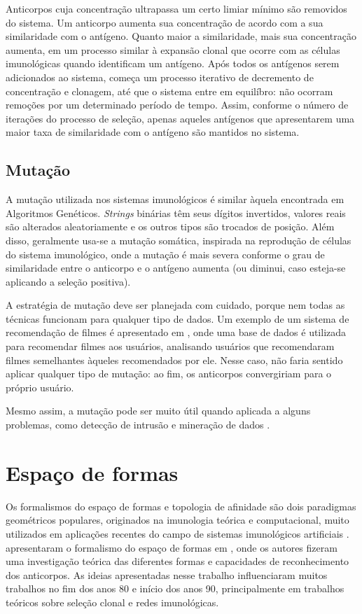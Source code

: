 Anticorpos cuja concentração ultrapassa um certo limiar mínimo são removidos do sistema. Um anticorpo aumenta sua concentração de acordo com a sua similaridade com o antígeno. Quanto maior a similaridade, mais sua concentração aumenta, em um processo similar à expansão clonal que ocorre com as células imunológicas quando identificam um antígeno. Após todos os antígenos serem adicionados ao sistema, começa um processo iterativo de decremento de concentração e clonagem, até que o sistema entre em equilíbro: não ocorram remoções por um determinado período de tempo. Assim, conforme o número de iterações do processo de seleção, apenas aqueles antígenos que apresentarem uma maior taxa de similaridade com o antígeno são mantidos no sistema.

\subsection{Mutação}

A mutação utilizada nos sistemas imunológicos é similar àquela encontrada em Algoritmos Genéticos. \emph{Strings} binárias têm seus dígitos invertidos, valores reais são alterados aleatoriamente e os outros tipos são trocados de posição. Além disso, geralmente usa-se a mutação somática, inspirada na reprodução de células do sistema imunológico, onde a mutação é mais severa conforme o grau de similaridade entre o anticorpo e o antígeno aumenta (ou diminui, caso esteja-se aplicando a seleção positiva). 

A estratégia de mutação deve ser planejada com cuidado, porque nem todas as técnicas funcionam para qualquer tipo de dados. Um exemplo de um sistema de recomendação de filmes é apresentado em \citet{Aickelin2005}, onde uma base de dados é utilizada para recomendar filmes aos usuários, analisando usuários que recomendaram filmes semelhantes àqueles recomendados por ele. Nesse caso, não faria sentido aplicar qualquer tipo de mutação: ao fim, os anticorpos convergiriam para o próprio usuário.

Mesmo assim, a mutação pode ser muito útil quando aplicada a alguns problemas, como detecção de intrusão e mineração de dados \cite{DeCastro2002}. 

\section{Espaço de formas}

Os formalismos do espaço de formas e topologia de afinidade são dois paradigmas geométricos populares, originados na imunologia teórica e computacional, muito utilizados em aplicações recentes do campo de sistemas imunológicos artificiais \cite{Brownlee2007}. \citeauthor{Perelson1979} apresentaram o formalismo do espaço de formas em \citet{Perelson1979}, onde os autores fizeram uma investigação teórica das diferentes formas e capacidades de reconhecimento dos anticorpos. As ideias apresentadas nesse trabalho influenciaram muitos trabalhos no fim dos anos 80 e início dos anos 90, principalmente em trabalhos teóricos sobre seleção clonal e redes imunológicas.

